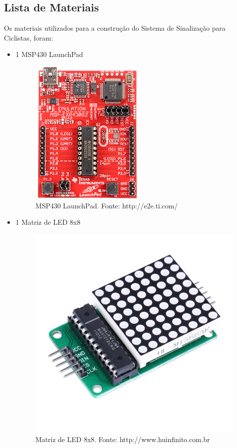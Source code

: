 \documentclass[conference]{IEEEtran}
\begin{document}
\subsection{Lista de Materiais}
Os materiais utilizados para a construção do Sistema de Sinalização para Ciclistas, foram:
\begin{itemize}
  \item 1 MSP430 LaunchPad
    \begin{figure}[H]
      \centering
      \includegraphics[width=0.5\linewidth]{MSP430-LaunchPad}
      \caption{MSP430 LaunchPad. Fonte: http://e2e.ti.com/}
      \label{fig:2500}
    \end{figure}

  \item 1 Matriz de LED 8x8
    \begin{figure}[H]
      \centering
      \includegraphics[width=0.5\linewidth]{matriz}
      \caption{Matriz de LED 8x8. Fonte: http://www.huinfinito.com.br}
      \label{fig:matriz}
    \end{figure}


\end{itemize}
\end{document}

